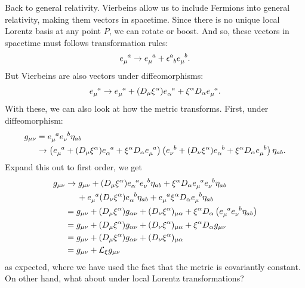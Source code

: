 \documentclass{book}
\numberwithin{equation}{section}
\theoremstyle{definition}
\newcommand{\lag}{\mathcal{L}}
\newcommand{\nn}{\nonumber}
\newcommand{\lp}{\left(}
\newcommand{\rp}{\right)}
\begin{document}
Back to general relativity. Vierbeins allow us to include Fermions into general relativity, making them vectors in spacetime. Since there is no unique local Lorentz basis at any point $P$, we can rotate or boost. And so, these vectors in spacetime must follows transformation rules:
\begin{align}
\tensor{e}{_\mu^a} \to \tensor{e}{_\mu^a} + \tensor{\epsilon}{^a_b}\tensor{e}{_\mu^b}.
\end{align}
But Vierbeins are also vectors under diffeomorphisms:
\begin{align}
\tensor{e}{_\mu^a} \to \tensor{e}{_\mu^a} + (D_\mu \xi^\alpha)\tensor{e}{_\alpha^a} + \xi^\alpha D_\alpha \tensor{e}{_\mu^a}.
\end{align}
With these, we can also look at how the metric transforms. First, under diffeomorphism:
\begin{align}
g_{\mu\nu} 
&= \tensor{e}{_\mu^a}\tensor{e}{_\nu^b}\eta_{ab}\\
&\to 
\lp \tensor{e}{_\mu^a} + (D_\mu \xi^\alpha)\tensor{e}{_\alpha^a} + \xi^\alpha D_\alpha \tensor{e}{_\mu^a} \rp
\lp \tensor{e}{_\nu^b} + (D_\nu \xi^\alpha)\tensor{e}{_\alpha^b} + \xi^\alpha D_\alpha \tensor{e}{_\mu^b} \rp 
\eta_{ab}.
\end{align}
Expand this out to first order, we get
\begin{align}
g_{\mu\nu} &\to g_{\mu\nu} + (D_\mu \xi^\alpha)\tensor{e}{_\alpha^a}\tensor{e}{_\nu^b}\eta_{ab} 
 + \xi^\alpha D_\alpha \tensor{e}{_\mu^a}\tensor{e}{_\nu^b}\eta_{ab} \nn \\
&\hspace{0.5cm} + \tensor{e}{_\mu^a}(D_\nu \xi^\alpha)\tensor{e}{_\alpha^b}\eta_{ab} 
+ \tensor{e}{_\mu^a}\xi^\alpha D_\alpha \tensor{e}{_\mu^b}\eta_{ab}\\
&= g_{\mu\nu} + (D_\mu \xi^\alpha)g_{\alpha\nu} + (D_\nu \xi^\alpha)_{\mu\alpha} + \xi^\alpha D_\alpha\lp \tensor{e}{_\mu^a}\tensor{e}{_\nu^b}\eta_{ab} \rp\\
&= g_{\mu\nu} + (D_\mu \xi^\alpha)g_{\alpha\nu} + (D_\nu \xi^\alpha)_{\mu\alpha} + \xi^\alpha D_\alpha g_{\mu\nu}\\
&= g_{\mu\nu} +  (D_\mu \xi^\alpha)g_{\alpha\nu} + (D_\nu \xi^\alpha)_{\mu\alpha}\\
&= g_{\mu\nu} + \lag_\xi g_{\mu\nu}
\end{align}
as expected, where we have used the fact that the metric is covariantly constant. On other hand, what about under local Lorentz transformations?
\end{document}
